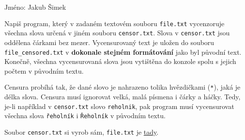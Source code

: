 \documentclass{exam}
\begin{document}
Jméno: Jakub Šimek
\begin{questions}
	\question[100]
	Napiš program, který v zadaném textovém souboru \texttt{file.txt}
	vycenzoruje všechna slova určená v jiném souboru \texttt{censor.txt}. Slova
	v \texttt{censor.txt} jsou oddělena čárkami bez mezer. Vycensurovaný text je
	uložen do souboru \texttt{file\_censored.txt} v \textbf{dokonale stejném
		formátování} jako byl původní text. Konečně, všechna vycensurovaná slova
	jsou vytištěna do konzole spolu s jejich počtem v původním textu.

	Censura probíhá tak, že dané slovo je nahrazeno tolika hvězdičkami
	(\texttt{*}), jaká je délka slova. Censura musí ignorovat velká, malá
	písmena i čárky a háčky. Tedy, je-li například v \texttt{censor.txt} slovo
	\texttt{reholnik}, pak program musí vycensurovat všechna slova
	\texttt{řeholník} i \texttt{Řeholník} v původním textu.

	Soubor \texttt{censor.txt} si vyrob sám, \texttt{file.txt} je
	\href{https://drive.google.com/file/d/1hSUMrPpdCYT3i1POkVOjx2itOmyUwW6i/view?usp=sharing}{tady}.
\end{questions}
\end{document}
